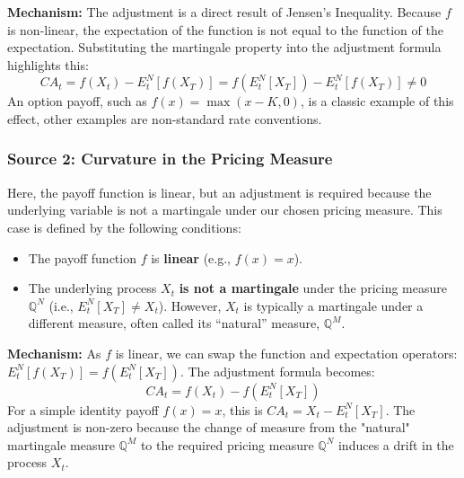 \documentclass[reviewdoc]{pmv_report} %
\begin{document}
\textbf{Mechanism:} The adjustment is a direct result of Jensen's Inequality. Because $f$ is non-linear, the expectation of the function is not equal to the function of the expectation. Substituting the martingale property into the adjustment formula highlights this:
\begin{equation}
    CA_t = f(X_t) - E^N_t \left[ f(X_T) \right] = f\left(E^N_t [X_T]\right) - E^N_t \left[ f(X_T) \right] \neq 0
\end{equation}
An option payoff, such as $f(x) = \max(x-K, 0)$, is a classic example of this effect, other examples are non-standard rate conventions.

\subsubsection*{Source 2: Curvature in the Pricing Measure}
Here, the payoff function is linear, but an adjustment is required because the underlying variable is not a martingale under our chosen pricing measure.
This case is defined by the following conditions:
\begin{itemize}
    \item The payoff function $f$ is \textbf{linear} (e.g., $f(x)=x$).
    \item The underlying process $X_t$ \textbf{is not a martingale} under the pricing measure $\mathbb{Q}^N$ (i.e., $E^N_t [X_T] \neq X_t$). However, $X_t$ is typically a martingale under a different measure, often called its ``natural'' measure, $\mathbb{Q}^M$.
\end{itemize}

\textbf{Mechanism:} As $f$ is linear, we can swap the function and expectation operators: $E^N_t [f(X_T)] = f(E^N_t [X_T])$. The adjustment formula becomes:
\begin{equation}
    CA_t = f(X_t) - f\left(E^N_t [X_T]\right)
\end{equation}
For a simple identity payoff $f(x)=x$, this is $CA_t = X_t - E^N_t [X_T]$. The adjustment is non-zero because the change of measure from the "natural" martingale measure $\mathbb{Q}^M$ to the required pricing measure $\mathbb{Q}^N$ induces a drift in the process $X_t$.
\end{document}
